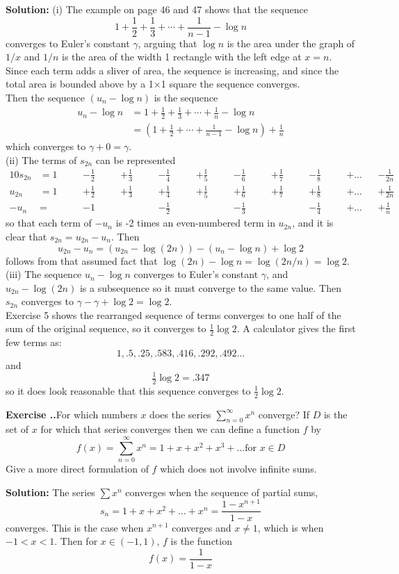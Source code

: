 \documentclass{article}
\newcounter{chapter}[section] %
\newcounter{example}[chapter]
\newcommand{\solution}[1]{\setlength{\hangindent}{\parindent} \indent\indent \textbf{Solution: }#1\hfill\break}
\newcommand{\exercise}[1]{
	
	\refstepcounter{example}
    \hangafter=1
    \setlength{\hangindent}{ 
    	\widthof{
			\large\textbf{Exercise \thesection.\thechapter.\theexample\enspace}
    	}-.5\parindent
    }
    {\setlength{\parindent}{0in}\large\textbf{Exercise \thesection.\thechapter.\theexample\enspace}#1}\hfill\break\par
}
\begin{document}
\solution{(i) The example on page 46 and 47 shows that the sequence 
$$1 + \frac{1}{2} + \frac{1}{3} + \dotsb +\frac{1}{n-1} - \log n$$ 
converges to Euler's constant $\gamma$, arguing that $\log n$ is the area under the graph of $1/x$ and $1/n$ is the area of the width 1 rectangle with the left edge at $x=n$. Since each term adds a sliver of area, the sequence is increasing, and since the total area is bounded above by a 1$\times$1 square the sequence converges. \\
Then the sequence $(u_n - \log n)$ is the sequence 
\begin{align*}
u_n-\log n&= 1 + \frac{1}{2} +\frac{1}{3} + \dotsb + \frac{1}{n} -\log n\\
&= \left(1 + \frac{1}{2} +\dotsb +\frac{1}{n-1} -\log n\right) + \frac{1}{n}
\end{align*}
which converges to $\gamma + 0 = \gamma$. \\ 
\indent (ii) The terms of $s_{2n}$ can be represented
\begin{alignat*}{10}
s_{2n} &= 1  \quad&& - \frac{1}{2}  \quad&& +  \frac{1}{3}  \quad&& - \frac{1}{4}  \quad&& +  \frac{1}{5}  \quad&&- \frac{1}{6}  \quad&& +  \frac{1}{7}  \quad&& -  \frac{1}{8}  \quad && +  \dots  && -   \frac{1}{2n}\\ 
u_{2n} &= 1&& +\frac{1}{2}&& + \frac{1}{3}&& + \frac{1}{4}&& + \frac{1}{5}&& + \frac{1}{6}&& + \frac{1}{7}&& + \frac{1}{8}&& + \dots&& + \frac{1}{2n}\\
-u_n &= && - 1  \quad&& && - \frac{1}{2}&& &&- \frac{1}{3}&& && - \frac{1}{4}&& + \dots &&+ \frac{1}{n} 
\end{alignat*}
\indent so that each term of $-u_n$ is -2 times an even-numbered term in $u_{2n}$, and it is clear that $s_{2n} = u_{2n} - u_n$. Then $$u_{2n} - u_n = (u_{2n} - \log (2n)) - (u_n - \log n) + \log 2 $$ follows from that assumed fact that $\log (2n) - \log n = \log (2n/n) = \log 2$. \\
\indent (iii) The sequence $u_n - \log n$ converges to Euler's constant $\gamma$, and $u_{2n} - \log (2n)$ is a subsequence so it must converge to the same value. Then $s_{2n}$ converges to $\gamma - \gamma + \log 2 = \log 2.$ \\
\indent Exercise 5 shows the rearranged sequence of terms converges to one half of the sum of the original sequence, so it converges to $\frac{1}{2}\log 2$. A calculator gives the first few terms as:
$$ 1, .5, .25, .583, .416, .292, .492\dots$$
and 
$$\tfrac{1}{2} \log 2 = .347$$
so it does look reasonable that this sequence converges to $\frac{1}{2}\log 2$.} %
\exercise{For which numbers $x$ does the series $\sum_{n=0}^\infty x^n$ converge? If $D$ is the set of $x$ for which that series converges then we can define a function $f$ by 
$$f(x) = \sum^\infty_{n=0} x^n = 1 + x + x^2 + x^3 +  \dots \text{for } x \in D$$
Give a more direct formulation of $f$ which does not involve infinite sums. } %
\solution{The series $\sum x^n$ converges when the sequence of partial sums, 
$$s_n = 1 + x + x^2 + \dots + x^n = \frac{1-x^{n+1}}{1-x}$$ 
converges. This is the case when $x^{n+1}$ converges and $x\neq 1$, which is when $-1 <x< 1$. Then for $x\in (-1, 1)$, $f$ is the function
$$ f(x) = \frac{1}{1-x}$$}%
\end{document}
